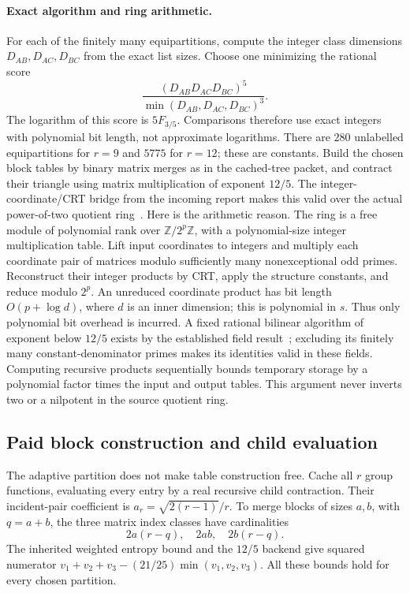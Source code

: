 \paragraph{Exact algorithm and ring arithmetic.}
For each of the finitely many equipartitions, compute the integer class
dimensions $D_{AB},D_{AC},D_{BC}$ from the exact list sizes.  Choose one
minimizing the rational score
\[
 \frac{(D_{AB}D_{AC}D_{BC})^5}
      {\min(D_{AB},D_{AC},D_{BC})^3}.
\]
The logarithm of this score is $5F_{3/5}$.  Comparisons therefore use
exact integers with polynomial bit length, not approximate logarithms.
There are $280$ unlabelled equipartitions for $r=9$ and $5775$ for $r=12$;
these are constants.  Build the chosen block tables by binary matrix
merges as in the cached-tree packet, and contract their triangle using
matrix multiplication of exponent $12/5$.  The integer-coordinate/CRT bridge from the incoming report makes this
valid over the actual power-of-two quotient ring~\cite{incomingtree}.
Here is the arithmetic reason. The ring is a free module of polynomial
rank over $\mathbb Z/2^p\mathbb Z$, with a polynomial-size integer
multiplication table. Lift input coordinates to integers and multiply each
coordinate pair of matrices modulo sufficiently many nonexceptional odd
primes. Reconstruct their integer products by CRT, apply the structure
constants, and reduce modulo $2^p$. An unreduced coordinate product has
bit length $O(p+\log d)$, where $d$ is an inner dimension; this is
polynomial in $s$. Thus only polynomial bit overhead is incurred. A fixed
rational bilinear algorithm of exponent below $12/5$ exists by the
established field result~\cite{mm}; excluding its finitely many
constant-denominator primes makes its identities valid in these fields.
Computing recursive products sequentially bounds temporary storage by a
polynomial factor times the input and output tables. This argument never
inverts two or a nilpotent in the source quotient ring.

\subsection{Paid block construction and child evaluation}
The adaptive partition does not make table construction free.  Cache all
$r$ group functions, evaluating every entry by a real recursive child
contraction.  Their incident-pair coefficient is
$a_r=\sqrt{2(r-1)}/r$.  To merge blocks of sizes $a,b$, with $q=a+b$,
the three matrix index classes have cardinalities
\[
 2a(r-q),\quad 2ab,\quad 2b(r-q).
\]
The inherited weighted entropy bound and the $12/5$ backend give squared
numerator $v_1+v_2+v_3-(21/25)\min(v_1,v_2,v_3)$.
All these bounds hold for every chosen partition.

